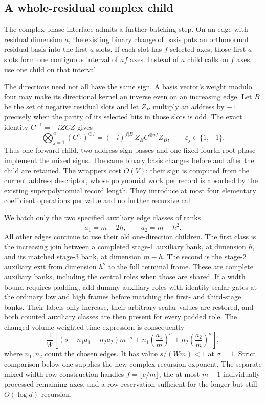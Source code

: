 \subsection{A whole-residual complex child}
\label{sec:bulk-complex-child}

The complex phase interface admits a further batching step. On an edge
with residual dimension $a$, the existing binary change of basis puts
an orthonormal residual basis into the first $a$ slots. If each slot has
$f$ selected axes, those first $a$ slots form one contiguous interval
of $af$ axes. Instead of $a$ child calls on $f$ axes, use one child
on that interval.

The directions need not all have the same sign. A basis vector's weight
modulo four may make its directional kernel an inverse even on an
increasing edge. Let $B$ be the set of negative residual slots and
let $Z_B$ multiply an address by $-1$ precisely when the parity of its
selected bits in those slots is odd. The exact identity
$C^{-1}=-iZCZ$ gives
\[
 \bigotimes_{j=1}^{a}(C^{\varepsilon_j})^{\otimes f}
 =(-i)^{f|B|}Z_B C^{\otimes af}Z_B,
 \qquad \varepsilon_j\in\{1,-1\}.
\]
Thus one forward child, two address-sign passes and one fixed
fourth-root phase implement the mixed signs. The same binary basis
changes before and after the child are retained. The wrappers cost
$O(V)$: their sign is computed from the current address descriptor,
whose polynomial work per record is absorbed by the existing
superpolynomial record length. They introduce at most four elementary
coefficient operations per value and no further recursive call.

We batch only the two specified auxiliary edge classes of ranks
\[
 a_1=m-2h,\qquad a_2=m-h^2.
\]
All other edges continue to use their old one-direction children.
The first class is the increasing join between a completed stage-1
auxiliary bank, at dimension $h$, and its matched stage-3 bank, at
dimension $m-h$. The second is the stage-2 auxiliary exit from
dimension $h^2$ to the full terminal frame. These are complete
auxiliary banks, including the central roles when those are shared.
If a width bound requires padding, add dummy auxiliary roles with
identity scalar gates at the ordinary low and high frames before
matching the first- and third-stage banks. Their labels only increase,
their arbitrary scalar values are restored, and both counted auxiliary
classes are then present for every padded role. The changed
volume-weighted time expression is consequently
\[
 \frac1W\left[
    \left(s-n_1a_1-n_2a_2\right)m^{-\sigma}
    +n_1\left(\frac{a_1}{m}\right)^\sigma
    +n_2\left(\frac{a_2}{m}\right)^\sigma
 \right],
\]
where $n_1,n_2$ count the chosen edges. It has value $s/(Wm)<1$
at $\sigma=1$. Strict comparison below one supplies the new complex
recursion exponent. The separate mixed-width row construction handles
$f=\lfloor e/m\rfloor$, the at most $m-1$ individually processed
remaining axes, and a row reservation sufficient for the longer but
still $O(\log d)$ recursion.


